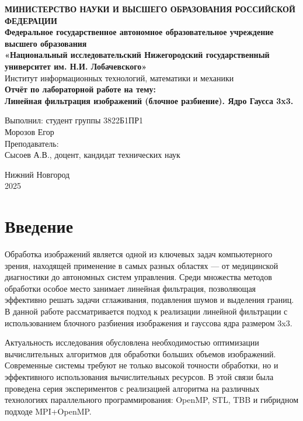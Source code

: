 \documentclass[a4paper,12pt]{article}
\begin{document}
\begin{titlepage}
\begin{center}
\textbf{МИНИСТЕРСТВО НАУКИ И ВЫСШЕГО ОБРАЗОВАНИЯ РОССИЙСКОЙ ФЕДЕРАЦИИ} \\[0.5cm]
\textbf{Федеральное государственное автономное образовательное учреждение высшего образования} \\[0.5cm]
\textbf{«Национальный исследовательский Нижегородский государственный университет им. Н.И. Лобачевского»} \\[0.5cm]
Институт информационных технологий, математики и механики \\
\vfill
{\Large
\textbf{Отчёт по лабораторной работе на тему:} \\[0.5cm]
\textbf{Линейная фильтрация изображений (блочное разбиение). Ядро Гаусса 3x3.} \\
}
\vfill
\begin{flushright}
Выполнил: студент группы 3822Б1ПР1 \\
Морозов Егор \\
\vspace{1cm}
Преподаватель: \\
Сысоев А.В., доцент, кандидат технических наук \\
\end{flushright}
\vfill
Нижний Новгород \\
2025
\end{center}
\end{titlepage}

\tableofcontents
\newpage

\section*{Введение}

Обработка изображений является одной из ключевых задач компьютерного зрения, находящей применение в самых разных областях — от медицинской диагностики до автономных систем управления. Среди множества методов обработки особое место занимает линейная фильтрация, позволяющая эффективно решать задачи сглаживания, подавления шумов и выделения границ. В данной работе рассматривается подход к реализации линейной фильтрации с использованием блочного разбиения изображения и гауссова ядра размером 3x3.

Актуальность исследования обусловлена необходимостью оптимизации вычислительных алгоритмов для обработки больших объемов изображений. Современные системы требуют не только высокой точности обработки, но и эффективного использования вычислительных ресурсов. В этой связи была проведена серия экспериментов с реализацией алгоритма на различных технологиях параллельного программирования: OpenMP, STL, TBB и гибридном подходе MPI+OpenMP. 
\end{document}
